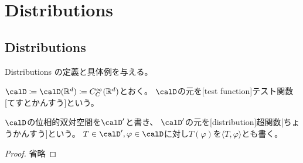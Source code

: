\documentclass[report]{jlreq}
\begin{document}
\chapter{Distributions}

%
\section{Distributions}

Distributions の定義と具体例を与える。

\begin{definition}[テスト関数]
    $\calD \coloneqq \calD(\R^d) \coloneqq C_\smooth(\R^d)$とおく。
    $\calD$の元を[test function]{テスト関数}[てすとかんすう]という。
\end{definition}

\begin{definition}
    \TODO{}
\end{definition}

\begin{definition}[超関数]
    $\calD$の位相的双対空間を$\calD'$と書き、
    $\calD'$の元を[distribution]{超関数}[ちょうかんすう]という。
    $T \in \calD', \varphi \in \calD$に対し$T(\varphi)$を$\langle T, \varphi \rangle$とも書く。
\end{definition}

\begin{example}[局所可積分関数]
    \TODO{}
\end{example}

\begin{proposition}[変分法の基本補題]
    \TODO{}
\end{proposition}

\begin{proof}
    省略
\end{proof}

\begin{example}
    \TODO{}
\end{example}

\begin{example}[波動方程式]
    \TODO{}
\end{example}

\begin{example}
    \TODO{}
\end{example}
\end{document}
